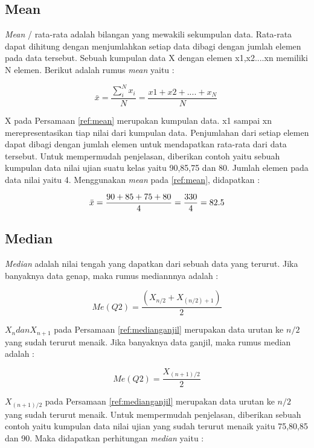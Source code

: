 \subsection{Mean}
\textit{Mean} / rata-rata adalah bilangan yang mewakili sekumpulan data. Rata-rata dapat dihitung dengan menjumlahkan setiap data dibagi dengan jumlah elemen pada data tersebut. Sebuah kumpulan data X dengan elemen x1,x2....xn memiliki N elemen. Berikut adalah rumus \textit{mean} yaitu : 

\begin{equation}
\bar{x} = \frac{\sum_{i}^{N}x_i}{N} = \frac{x1+x2+....+x_N}{N} \
\label{ref:mean}
\end{equation}

X pada Persamaan \ref{ref:mean} merupakan kumpulan data. x1 sampai xn merepresentasikan tiap nilai dari kumpulan data. Penjumlahan dari setiap elemen dapat dibagi dengan jumlah elemen untuk mendapatkan rata-rata dari data tersebut. Untuk mempermudah penjelasan, diberikan contoh yaitu sebuah kumpulan data nilai ujian suatu kelas yaitu 90,85,75 dan 80. Jumlah elemen pada data nilai yaitu 4. Menggunakan \textit{mean} pada \ref{ref:mean}, didapatkan : 

\begin{displaymath}
\bar{x} = \frac{90+85+75+80}{4} \\
= \frac{330}{4} = 82.5
\end{displaymath}


\subsection{Median}
\textit{Median} adalah nilai tengah yang dapatkan dari sebuah data yang terurut. Jika banyaknya data genap, maka rumus mediannnya adalah : 

\begin{equation}
Me(Q2) = \frac{(X_{n/2} + X_{(n/2)+1})}{2}
\label{ref:mediangenap}
\end{equation}
	
$X_n dan X_{n+1}$ pada Persamaan \ref{ref:medianganjil} merupakan data urutan ke $n/2$ yang sudah terurut menaik. Jika banyaknya data ganjil, maka rumus median adalah : 

\begin{equation}
Me(Q2) = \frac{X_{(n+1)/2}}{2}
\label{ref:medianganjil}
\end{equation}

 $X_{(n+1)/2}$ pada Persamaan \ref{ref:medianganjil} merupakan data urutan ke $n/2$ yang sudah terurut menaik. Untuk mempermudah penjelasan, diberikan sebuah contoh yaitu kumpulan data nilai ujian yang sudah terurut menaik yaitu 75,80,85 dan 90. Maka didapatkan perhitungan \textit{median} yaitu :
 
